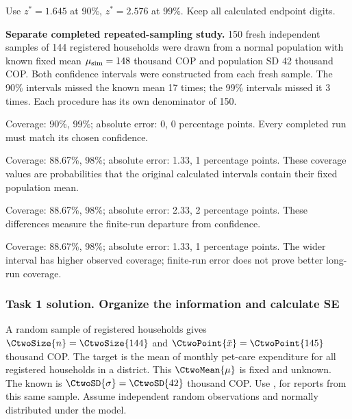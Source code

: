 Use $z^*=1.645$ at 90\%, $z^*=2.576$ at 99\%. Keep all calculated endpoint digits.

\textbf{Separate completed repeated-sampling study.} 150 fresh independent samples of 144 registered households were drawn from a normal population with known fixed mean $\mu_{\rm sim}=148$ thousand COP and population SD 42 thousand COP. Both confidence intervals were constructed from each fresh sample.
The 90\% intervals missed the known mean 17 times; the 99\% intervals missed it 3 times. Each procedure has its own denominator of 150.

\begin{answeroptions}
\item Coverage: 90\%, 99\%; absolute error: 0, 0 percentage points. Every completed run must match its chosen confidence.
\item Coverage: 88.67\%, 98\%; absolute error: 1.33, 1 percentage points. These coverage values are probabilities that the original calculated intervals contain their fixed population mean.
\item Coverage: 88.67\%, 98\%; absolute error: 2.33, 2 percentage points. These differences measure the finite-run departure from confidence.
\item Coverage: 88.67\%, 98\%; absolute error: 1.33, 1 percentage points. The wider interval has higher observed coverage; finite-run error does not prove better long-run coverage.
\end{answeroptions}
\clearpage
\subsubsection*{Task 1 solution. Organize the information and calculate SE}
\label{sol:c2-2-a}
A random sample of  registered households gives $\CtwoSize{n}=\CtwoSize{144}$ and  $\CtwoPoint{\bar{x}}=\CtwoPoint{145}$ thousand COP. The target is the mean of monthly pet-care expenditure for all registered households in a district. This  $\CtwoMean{\mu}$ is fixed and unknown. The known  is $\CtwoSD{\sigma}=\CtwoSD{42}$ thousand COP. Use ,   for reports from this same sample. Assume independent random observations and normally distributed  under the model.

